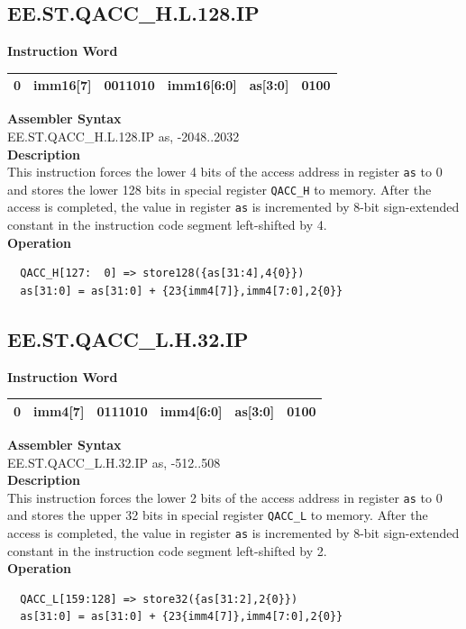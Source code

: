 \clearpage
\subsection{EE.ST.QACC\_H.L.128.IP}\label{instruction:EESTQACCHL128IP}
\setlength\tabcolsep{6pt}
\textbf{Instruction Word} \\
\begin{tabular}{|c|c|c|c|c|c|}
	\hline
	0 & imm16[7] & 0011010 & imm16[6:0] & as[3:0] & 0100 \\
	\hline
\end{tabular}

\textbf{Assembler Syntax} \\
EE.ST.QACC\_H.L.128.IP as, -2048..2032 \\
\textbf{Description} \\
This instruction forces the lower 4 bits of the access address in register \lstinline{as} to 0 and stores the lower 128 bits in special register \lstinline{QACC_H} to memory. After the access is completed, the value in register \lstinline{as} is incremented by 8-bit sign-extended constant in the instruction code segment left-shifted by 4.\\
\textbf{Operation}
\begin{lstlisting}
  QACC_H[127:  0] => store128({as[31:4],4{0}})
  as[31:0] = as[31:0] + {23{imm4[7]},imm4[7:0],2{0}}
\end{lstlisting}

\clearpage
\subsection{EE.ST.QACC\_L.H.32.IP}\label{instruction:EESTQACCLH32IP}
\setlength\tabcolsep{6pt}
\textbf{Instruction Word} \\
\begin{tabular}{|c|c|c|c|c|c|}
	\hline
	0 & imm4[7] & 0111010 & imm4[6:0] & as[3:0] & 0100 \\
	\hline
\end{tabular}

\textbf{Assembler Syntax} \\
EE.ST.QACC\_L.H.32.IP as, -512..508 \\
\textbf{Description} \\
This instruction forces the lower 2 bits of the access address in register \lstinline{as} to 0 and stores the upper 32 bits in special register \lstinline{QACC_L} to memory. After the access is completed, the value in register \lstinline{as} is incremented by 8-bit sign-extended constant in the instruction code segment left-shifted by 2.\\
\textbf{Operation}
\begin{lstlisting}
  QACC_L[159:128] => store32({as[31:2],2{0}})
  as[31:0] = as[31:0] + {23{imm4[7]},imm4[7:0],2{0}}
\end{lstlisting}

